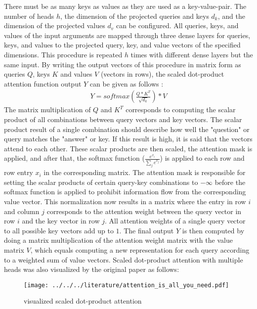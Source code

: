 \documentclass[draft,final]{vutinfth} %
\begin{document}
    There must be as many keys as values as they are used as a key-value-pair.
    The number of heads $h$, the dimension of the projected queries and keys $d_k$, and the dimension of the projected values $d_v$ can be configured.
    All queries, keys, and values of the input arguments are mapped through three dense layers for queries, keys, and values to the projected query, key, and value vectors of the specified dimensions.
    This procedure is repeated $h$ times with different dense layers but the same input.
    By writing the output vectors of this procedure in matrix form as queries $Q$, keys $K$ and values $V$ (vectors in rows), the scaled dot-product attention function output $Y$ can be given as follows \cite[p. 4]{Transformer}:
    \begin{align}
        \label{sdpa}
        Y = softmax \left( \frac{Q * K^T}{\sqrt{d_k}} \right) * V
    \end{align}
    The matrix multiplication of $Q$ and $K^T$ corresponds to computing the scalar product of all combinations between query vectors and key vectors.
    The scalar product result of a single combination should describe how well the "question" or query matches the "answer" or key.
    If this result is high, it is said that the vectors attend to each other.
    These scalar products are then scaled, the attention mask is applied, and after that, the softmax function ($\frac{e^{x_i}}{\sum_j{e^{x_j}}}$) is applied to each row and row entry $x_i$ in the corresponding matrix.
    The attention mask is responsible for setting the scalar products of certain query-key combinations to $-\infty$ before the softmax function is applied to prohibit information flow from the corresponding value vector.
    This normalization now results in a matrix where the entry in row $i$ and column $j$ corresponds to the attention weight between the query vector in row $i$ and the key vector in row $j$.
    All attention weights of a single query vector to all possible key vectors add up to $1$.
    The final output $Y$ is then computed by doing a matrix multiplication of the attention weight matrix with the value matrix $V$, which equals computing a new representation for each query according to a weighted sum of value vectors.
    Scaled dot-product attention with multiple heads was also visualized by the original paper as follows:
    \begin{figure}[H]
        \centering{}
        \texttt{[image: ../../../literature/attention\_is\_all\_you\_need.pdf]}
        \caption{visualized scaled dot-product attention \cite[p. 4]{Transformer}}
        \label{fig:sdpa_vis}
    \end{figure}
\end{document}
